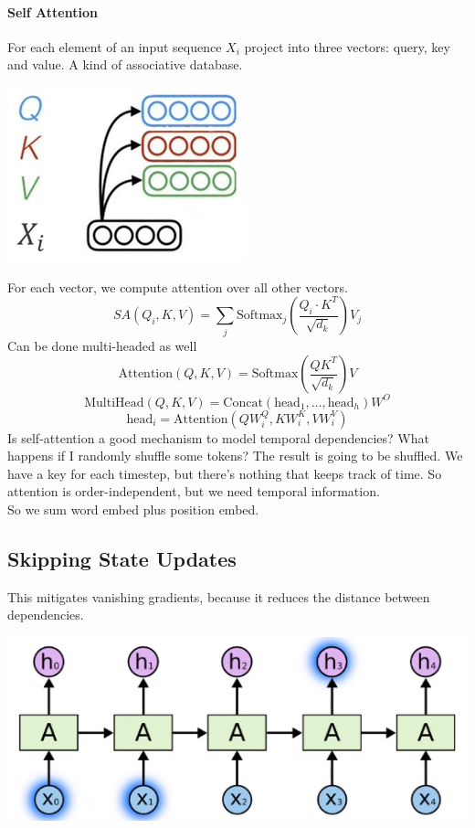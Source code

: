 \documentclass[10pt]{report}
\begin{document}
\paragraph{Self Attention} For each element of an input sequence $X_i$ project into three vectors: query, key and value. A kind of associative database.
\begin{center}
	\includegraphics[scale=0.5]{119.png}
\end{center}
For each vector, we compute attention over all other vectors.
$$SA(Q_i, K, V) = \sum_j\text{Softmax}_j\left(\frac{Q_i\cdot K^T}{\sqrt{d_k}}\right)V_j$$
Can be done multi-headed as well
$$\text{Attention}(Q,K,V)=\text{Softmax}\left(\frac{QK^T}{\sqrt{d_k}}\right)V$$
$$\text{MultiHead}(Q,K,V) = \text{Concat}(\text{head}_1,\ldots,\text{head}_h)W^O$$
$$\text{head}_i = \text{Attention}(QW_i^Q, KW_i^K, VW_i^V)$$
Is self-attention a good mechanism to model temporal dependencies? What happens if I randomly shuffle some tokens? The result is going to be shuffled. We have a key for each timestep, but there's nothing that keeps track of time. So attention is order-independent, but we need temporal information.\\
So we sum word embed plus position embed.
\subsection{Skipping State Updates}
This mitigates vanishing gradients, because it reduces the distance between dependencies.
\begin{center}
	\includegraphics[scale=0.5]{120.png}
\end{center}
\end{document}

